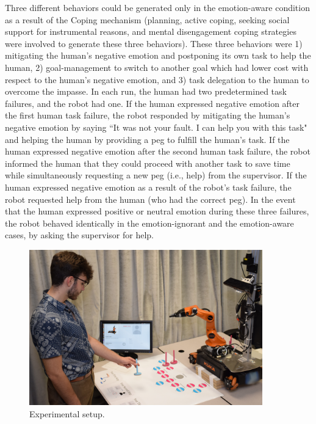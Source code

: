 \documentclass[12pt]{report}
\begin{document}
Three different behaviors could be generated only in the emotion-aware
condition as a result of the Coping mechanism (planning, active coping, seeking
social support for instrumental reasons, and mental disengagement coping
strategies were involved to generate these three behaviors). These three
behaviors were 1) mitigating the human's negative emotion and postponing its own
task to help the human, 2) goal-management to switch to another goal which had
lower cost with respect to the human's negative emotion, and 3) task delegation
to the human to overcome the impasse. In each run, the human had two
predetermined task failures, and the robot had one. If the human expressed
negative emotion after the first human task failure, the robot responded by
mitigating the human's negative emotion by saying  ``It was not your fault. I
can help you with this task" and helping the human by providing a peg to fulfill
the human's task. If the human expressed negative emotion after the second human
task failure, the robot informed the human that they could proceed with another
task to save time while simultaneously requesting a new peg (i.e., help) from
the supervisor. If the human expressed negative emotion as a result of the
robot's task failure, the robot requested help from the human (who had the
correct peg). In the event that the human expressed positive or neutral emotion
during these three failures, the robot behaved identically in the
emotion-ignorant and the emotion-aware cases, by asking the supervisor for help.

\begin{figure}
  \centering
  \includegraphics[width=0.9\textwidth]{figure/environment.png}
  \caption{Experimental setup.}
  \label{fig:environment}
\end{figure}
\end{document}

